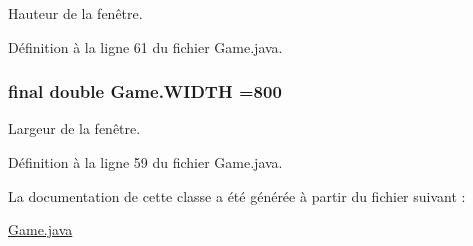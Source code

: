 Hauteur de la fenêtre. 


\begin{DoxyItemize}
\item 
\end{DoxyItemize}

Définition à la ligne 61 du fichier Game.\-java.

\hypertarget{class_game_a717d94203369772a9d40c0efc20eb779}{
\subsubsection[{W\-I\-D\-T\-H}]{\setlength{\rightskip}{0pt plus 5cm}final double Game.\-W\-I\-D\-T\-H =800\hspace{0.3cm}{\ttfamily [static]}}}\label{class_game_a717d94203369772a9d40c0efc20eb779}


Largeur de la fenêtre. 


\begin{DoxyItemize}
\item 
\end{DoxyItemize}

Définition à la ligne 59 du fichier Game.\-java.



La documentation de cette classe a été générée à partir du fichier suivant \-:\begin{DoxyCompactItemize}
\item 
\hyperlink{_game_8java}{Game.\-java}\end{DoxyCompactItemize}

